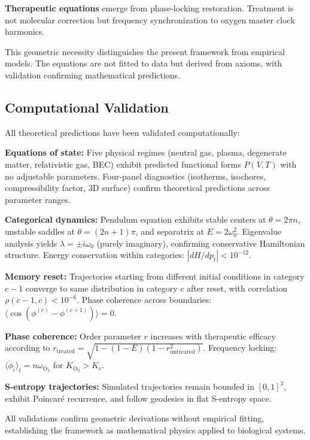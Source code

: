 \documentclass[11pt,twocolumn,a4paper]{article}
\theoremstyle{definition}
\theoremstyle{remark}
\begin{document}
\textbf{Therapeutic equations} emerge from phase-locking restoration. Treatment is not molecular correction but frequency synchronization to oxygen master clock harmonics.

This geometric necessity distinguishes the present framework from empirical models. The equations are not fitted to data but derived from axioms, with validation confirming mathematical predictions.

\subsection{Computational Validation}

All theoretical predictions have been validated computationally:

\textbf{Equations of state:} Five physical regimes (neutral gas, plasma, degenerate matter, relativistic gas, BEC) exhibit predicted functional forms $P(V,T)$ with no adjustable parameters. Four-panel diagnostics (isotherms, isochores, compressibility factor, 3D surface) confirm theoretical predictions across parameter ranges.

\textbf{Categorical dynamics:} Pendulum equation exhibits stable centers at $\theta = 2\pi n$, unstable saddles at $\theta = (2n+1)\pi$, and separatrix at $E = 2\omega_0^2$. Eigenvalue analysis yields $\lambda = \pm i\omega_0$ (purely imaginary), confirming conservative Hamiltonian structure. Energy conservation within categories: $|dH/dp_t| < 10^{-12}$.

\textbf{Memory reset:} Trajectories starting from different initial conditions in category $c-1$ converge to same distribution in category $c$ after reset, with correlation $\rho(c-1,c) < 10^{-6}$. Phase coherence across boundaries: $\langle\cos(\phi^{(c)} - \phi^{(c+1)})\rangle = 0$.

\textbf{Phase coherence:} Order parameter $r$ increases with therapeutic efficacy according to $r_{\mathrm{treated}} = \sqrt{1 - (1-E)(1-r_{\mathrm{untreated}}^2)}$. Frequency locking: $\langle\dot{\phi}_i\rangle_t = n\omega_{\mathrm{O_2}}$ for $K_{\mathrm{O_2}} > K_c$.

\textbf{S-entropy trajectories:} Simulated trajectories remain bounded in $[0,1]^3$, exhibit Poincaré recurrence, and follow geodesics in flat S-entropy space.

All validations confirm geometric derivations without empirical fitting, establishing the framework as mathematical physics applied to biological systems.
\end{document}
